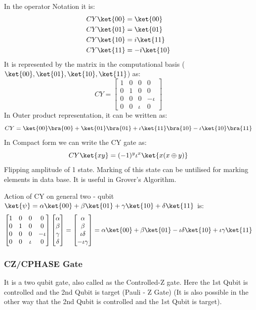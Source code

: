 \documentclass[12pt, oneside]{book}
\theoremstyle{definition}
\theoremstyle{definition}
\theoremstyle{remark}
\begin{document}
In the operator Notation it is:
\begin{align*}
    CY\ket{00}&=\ket{00} \\
    CY\ket{01}&=\ket{01} \\
    CY\ket{10}&=i\ket{11} \\
    CY\ket{11}&=-i\ket{10}
\end{align*}
It is represented by the matrix in the computational basis ($\ket{00},\ket{01},\ket{10},\ket{11}$) as:
\[
    CY=\begin{bmatrix}
        1 & 0 & 0 & 0 \\
        0 & 1 & 0 & 0 \\
        0 & 0 & 0 & -\iota \\
        0 & 0 & \iota & 0
    \end{bmatrix}
\]
In Outer product representation, it can be written as:
\[
    CY=\ket{00}\bra{00}+\ket{01}\bra{01}+\iota\ket{11}\bra{10}-\iota\ket{10}\bra{11}
\]
In Compact form we can write the CY gate as:
\[
    CY\ket{xy}=(-1)^y\iota^x\ket{x(x\oplus y)}
\]
Flipping amplitude of 1 state. Marking of this state can be untilised for marking elements in data base.
It is useful in Grover's Algorithm.

Action of CY on general two - qubit $\ket{\psi} = \alpha\ket{00}+\beta\ket{01}+\gamma\ket{10}+\delta\ket{11}$ is:
\[
    \begin{bmatrix} 
        1 & 0 & 0 & 0 \\
        0 & 1 & 0 & 0 \\
        0 & 0 & 0 & -\iota \\
        0 & 0 & \iota & 0
    \end{bmatrix}\begin{bmatrix}
        \alpha \\
        \beta \\
        \gamma \\
        \delta
    \end{bmatrix}=\begin{bmatrix}
        \alpha \\
        \beta \\
        \iota\delta \\
        -\iota\gamma
    \end{bmatrix}=\alpha\ket{00}+\beta\ket{01}-\iota\delta\ket{10}+\iota\gamma\ket{11}
\]

\subsubsection{CZ/CPHASE Gate}
It is a two qubit gate, also called as the Controlled-Z gate.
Here the 1st Qubit is controlled and the 2nd Qubit is target (Pauli - Z Gate)
(It is also possible in the other way that the 2nd Qubit is controlled and the 1st Qubit is target).
\end{document}
